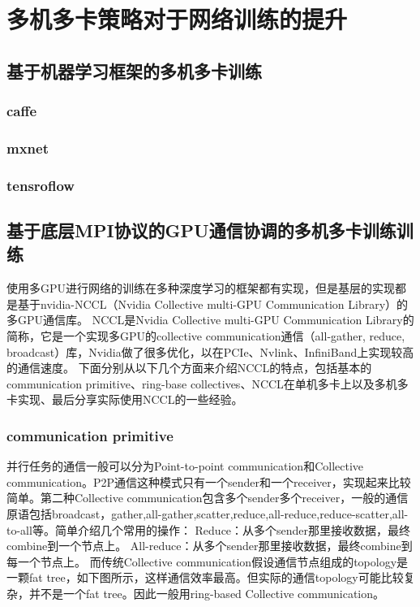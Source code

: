 \section{多机多卡策略对于网络训练的提升}

\subsection{基于机器学习框架的多机多卡训练}

\subsubsection{caffe}

\subsubsection{mxnet}

\subsubsection{tensroflow}


\subsection{基于底层MPI协议的GPU通信协调的多机多卡训练训练}
使用多GPU进行网络的训练在多种深度学习的框架都有实现，但是基层的实现都是基于nvidia-NCCL（Nvidia Collective multi-GPU Communication Library）的多GPU通信库。
NCCL是Nvidia Collective multi-GPU Communication Library的简称，它是一个实现多GPU的collective communication通信（all-gather, reduce, broadcast）库，Nvidia做了很多优化，以在PCIe、Nvlink、InfiniBand上实现较高的通信速度。
下面分别从以下几个方面来介绍NCCL的特点，包括基本的communication primitive、ring-base collectives、NCCL在单机多卡上以及多机多卡实现、最后分享实际使用NCCL的一些经验。
\subsubsection{communication primitive}
并行任务的通信一般可以分为Point-to-point communication和Collective communication。P2P通信这种模式只有一个sender和一个receiver，实现起来比较简单。第二种Collective communication包含多个sender多个receiver，一般的通信原语包括broadcast，gather,all-gather,scatter,reduce,all-reduce,reduce-scatter,all-to-all等。简单介绍几个常用的操作：
Reduce：从多个sender那里接收数据，最终combine到一个节点上。
All-reduce：从多个sender那里接收数据，最终combine到每一个节点上。
而传统Collective communication假设通信节点组成的topology是一颗fat tree，如下图所示，这样通信效率最高。但实际的通信topology可能比较复杂，并不是一个fat tree。因此一般用ring-based Collective communication。

